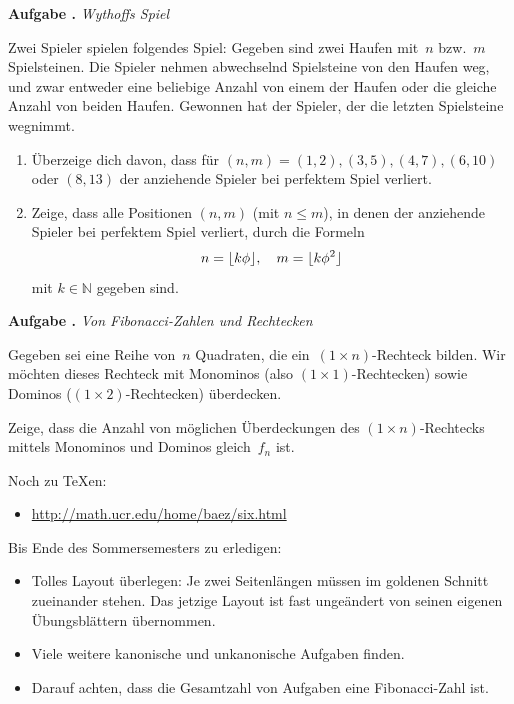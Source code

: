 \documentclass[a4paper,ngerman]{scrartcl}
\newlength{\aufgabenskip}
\newcounter{aufgabennummer}
\newenvironment{aufgabe}[1]{
  \addtocounter{aufgabennummer}{1}
  \textbf{Aufgabe \theaufgabennummer.} \emph{#1} \par
}{\vspace{\aufgabenskip}}
\newcommand{\NN}{\mathbb{N}}
\DeclarePairedDelimiter{\floor}{\lfloor}{\rfloor}
\begin{document}
\begin{aufgabe}{Wythoffs Spiel}
Zwei Spieler spielen folgendes Spiel: Gegeben sind zwei Haufen mit~$n$
bzw.~$m$ Spielsteinen. Die Spieler nehmen abwechselnd Spielsteine von
den Haufen weg, und zwar entweder eine beliebige Anzahl von einem der
Haufen oder die gleiche Anzahl von beiden Haufen. Gewonnen hat der
Spieler, der die letzten Spielsteine wegnimmt.
\begin{enumerate}
\item Überzeige dich davon, dass für $(n,m) = (1,2),(3,5),(4,7),(6,10)$
oder $(8,13)$ der anziehende Spieler bei perfektem Spiel verliert.
\item Zeige, dass alle Positionen $(n,m)$ (mit $n\leq m$), in denen der
anziehende Spieler bei perfektem Spiel verliert, durch die Formeln
\[ n = \floor{k\phi}, \quad m = \floor{k\phi^2} \]
mit $k\in\NN$ gegeben sind.
\end{enumerate}
\end{aufgabe}

\begin{aufgabe}{Von Fibonacci-Zahlen und Rechtecken}
Gegeben sei eine Reihe von~$n$ Quadraten, die ein~$(1 \times n)$-Rechteck
bilden. Wir möchten dieses Rechteck mit Monominos (also
$(1 \times 1)$-Rechtecken) sowie Dominos ($(1\times 2)$-Rechtecken) überdecken.

Zeige, dass die Anzahl von möglichen Überdeckungen des $(1 \times n)$-Rechtecks
mittels Monominos und Dominos gleich~$f_n$ ist.
\end{aufgabe}

\vfill

Noch zu \TeX{}en:
\begin{itemize}
\item \url{http://math.ucr.edu/home/baez/six.html}
\end{itemize}

Bis Ende des Sommersemesters zu erledigen:
\begin{itemize}
\item Tolles Layout überlegen: Je zwei Seitenlängen müssen im goldenen Schnitt
zueinander stehen. Das jetzige Layout ist fast ungeändert von seinen eigenen
Übungsblättern übernommen.
\item Viele weitere kanonische und unkanonische Aufgaben finden.
\item Darauf achten, dass die Gesamtzahl von Aufgaben eine Fibonacci-Zahl ist.
\end{itemize}
\end{document}
